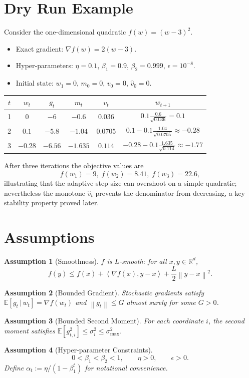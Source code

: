 \documentclass{article}
\newtheorem{assumption}{Assumption}
\newcommand{\E}{\mathbb{E}}
\newcommand{\R}{\mathbb{R}}
\newcommand{\norm}[1]{\left\|#1\right\|}
\newcommand{\ip}[2]{\left\langle #1,#2\right\rangle}
\begin{document}
\section*{Dry Run Example}
Consider the one‑dimensional quadratic $f(w)=(w-3)^2$.
\begin{itemize}
\item Exact gradient: $\nabla f(w)=2(w-3)$.
\item Hyper‑parameters: $\eta=0.1$, $\beta_1=0.9$, $\beta_2=0.999$, $\epsilon=10^{-8}$.
\item Initial state: $w_1=0$, $m_0=0$, $v_0=0$, $\hat{v}_0=0$.
\end{itemize}
\begin{center}
\begin{tabular}{c|c|c|c|c|c}
$t$ & $w_t$ & $g_t$ & $m_t$ & $v_t$ & $w_{t+1}$ \\ \hline
1 & $0$ & $-6$ & $-0.6$ & $0.036$ & $0.1\displaystyle\frac{0.6}{\sqrt{0.036}}=0.1$ \\[4pt]
2 & $0.1$ & $-5.8$ & $-1.04$ & $0.0705$ & $0.1-0.1\displaystyle\frac{1.04}{\sqrt{0.0705}} \approx -0.28$ \\[4pt]
3 & $-0.28$ & $-6.56$ & $-1.635$ & $0.114$ & $-0.28-0.1\displaystyle\frac{1.635}{\sqrt{0.114}}\approx -1.77$
\end{tabular}
\end{center}
After three iterations the objective values are
\[
f(w_1)=9,\; f(w_2)=8.41,\; f(w_3)=22.6,
\]
illustrating that the adaptive step size can overshoot on a simple quadratic; nevertheless the monotone $\hat v_t$ prevents the denominator from decreasing, a key stability property proved later.

\section*{Assumptions}
\begin{assumption}[Smoothness]\label{ass:smooth}
$f$ is $L$‑smooth: for all $x,y\in\R^{d}$,
\[
f(y)\le f(x)+\ip{\nabla f(x)}{y-x}+\frac{L}{2}\norm{y-x}^{2}.
\]
\end{assumption}
\begin{assumption}[Bounded Gradient]\label{ass:bound}
Stochastic gradients satisfy $\E[g_t\,|\,w_t]=\nabla f(w_t)$ and $\norm{g_t}\le G$ almost surely for some $G>0$.
\end{assumption}
\begin{assumption}[Bounded Second Moment]\label{ass:second}
For each coordinate $i$, the second moment satisfies $\E[g_{t,i}^{2}]\le \sigma_i^{2}\le \sigma_{\max}^{2}$.
\end{assumption}
\begin{assumption}[Hyper‑parameter Constraints]\label{ass:hyper}
\[
0<\beta_1<\beta_2<1,\qquad \eta>0,\qquad \epsilon>0.
\]
Define $\alpha_t:=\eta/(1-\beta_1^{t})$ for notational convenience.
\end{assumption}
\end{document}

